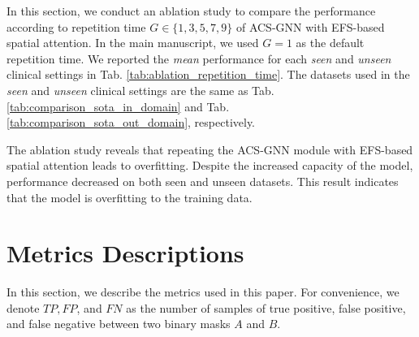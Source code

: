 In this section, we conduct an ablation study to compare the performance according to repetition time $G \in \{ 1, 3, 5, 7, 9 \}$ of ACS-GNN with EFS-based spatial attention. In the main manuscript, we used $G = 1$ as the default repetition time. We reported the \textit{mean} performance for each \textit{seen} and \textit{unseen} clinical settings in Tab. \ref{tab:ablation_repetition_time}. The datasets used in the \textit{seen} and \textit{unseen} clinical settings are the same as Tab. \ref{tab:comparison_sota_in_domain} and Tab. \ref{tab:comparison_sota_out_domain}, respectively. 

The ablation study reveals that repeating the ACS-GNN module with EFS-based spatial attention leads to overfitting. Despite the increased capacity of the model, performance decreased on both seen and unseen datasets. This result indicates that the model is overfitting to the training data.

\section{Metrics Descriptions}
\label{appendix_metric_descriptions}

In this section, we describe the metrics used in this paper. For convenience, we denote $TP, FP$, and $FN$ as the number of samples of true positive, false positive, and false negative between two binary masks $A$ and $B$.  


